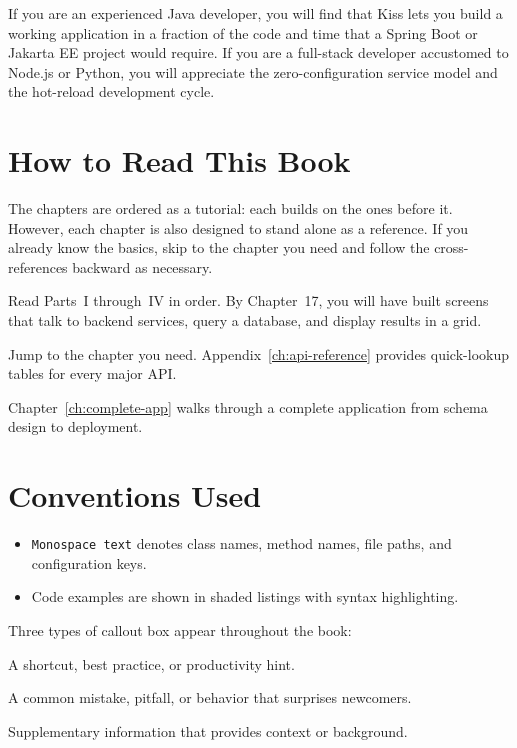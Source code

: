 If you are an experienced Java developer, you will find that Kiss lets you build a working application in a fraction of the code and time that a Spring Boot or Jakarta EE project would require.  If you are a full-stack developer accustomed to Node.js or Python, you will appreciate the zero-configuration service model and the hot-reload development cycle.

\section{How to Read This Book}
\label{sec:intro-reading}

The chapters are ordered as a tutorial: each builds on the ones before it.  However, each chapter is also designed to stand alone as a reference.  If you already know the basics, skip to the chapter you need and follow the cross-references backward as necessary.

\begin{description}[style=nextline]
  \item[Tutorial track] Read Parts~I through~IV in order.  By Chapter~17, you will have built screens that talk to backend services, query a database, and display results in a grid.
  \item[Reference track] Jump to the chapter you need.  Appendix~\ref{ch:api-reference} provides quick-lookup tables for every major API.
  \item[Capstone] Chapter~\ref{ch:complete-app} walks through a complete application from schema design to deployment.
\end{description}

\section{Conventions Used}
\label{sec:intro-conventions}

\begin{itemize}
  \item \texttt{Monospace text} denotes class names, method names, file paths, and configuration keys.
  \item Code examples are shown in shaded listings with syntax highlighting.
\end{itemize}

\noindent
Three types of callout box appear throughout the book:

\begin{tipbox}
A shortcut, best practice, or productivity hint.
\end{tipbox}

\begin{warnbox}
A common mistake, pitfall, or behavior that surprises newcomers.
\end{warnbox}

\begin{notebox}
Supplementary information that provides context or background.
\end{notebox}
